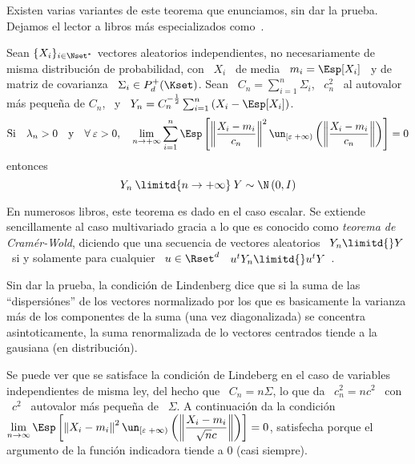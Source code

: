 Existen  varias   variantes  de  este   teorema  que  enunciamos,  sin   dar  la
prueba.  Dejamos el  lector a  libros m\'as  especializados como~\cite{AshDol99,
  Bil12, AthLah06, Lin22}.

\begin{teorema}\label{Teo:MP:LindenbergFeller}
%
  Sean  $\{  X_i \}_{i  \in  \Nset^*}$  vectores  aleatorios independientes,  no
  necesariamente de misma distribuci\'on de probabilidad, con \ $X_i$ \ de media
  \ $m_i = \Esp[X_i]$ \ y de matriz de covarianza \ $\Sigma_i \in P_d^+(\Kset)$.
  Sean \ $C_n = \sum_{i=1}^n \Sigma_i$, \ $c_n^2$ \ al autovalor m\'as peque\~na
  de $C_n$,  \ y  \ $Y_n  = C_n^{-\frac12} \sum_{i=1}^n  \left( X_i  - \Esp[X_i]
  \right)$.
  \[
  \mbox{Si} \quad \lambda_n > 0 \quad \mbox{y} \quad \forall \: \varepsilon > 0,
  \quad  \lim_{n  \to  +\infty}  \sum_{i=1}^n  \Esp\left[  \left\|  \frac{X_i  -
        m_i}{c_n} \right\|^2  \un_{\left[ \varepsilon \;  +\infty \right)}\left(
      \left\| \frac{X_i - m_i}{c_n} \right\| \right) \right] = 0
  \]
  entonces
  \[
  Y_n \: \limitd{n \to +\infty} \: Y \sim \N\left( 0 , I \right)
  \]
\end{teorema}
%
En  numerosos libros,  este teorema  es  dado en  el caso  escalar. Se  extiende
sencillamente al caso multivariado gracia a lo que es conocido como {\it teorema
  de Cram\'er-Wold},  diciendo que una  secuencia de vectores aleatorios  \ $Y_n
\limitd{}  Y$ \  si y  solamente para  cualquier \  $u \in  \Rset^d$ \  $u^t Y_n
\limitd{} u^t Y$~\cite{AshDol99, AthLah06, Bil12}.

Sin dar  la prueba,  la condici\'on  de Lindenberg dice  que si  la suma  de las
``dispersi\'ones'' de  los vectores  normalizado por los  que es  basicamente la
varianza  m\'as  de  los componentes  de  la  suma  (una vez  diagonalizada)  se
concentra asintoticamente, la suma renormalizada de lo vectores centrados tiende
a la gausiana (en distribuci\'on).

Se  puede ver  que  se  satisface la  condici\'on  de Lindeberg  en  el caso  de
variables independientes de misma ley, del hecho  que \ $C_n = n \Sigma$, lo que
da \ $c_n^2 = n c^2$ \ con  \ $c^2$ \ autovalor m\'as peque\~na de \ $\Sigma$. A
continuaci\'on da la condici\'on \ $\displaystyle \lim_{n \to \infty} \Esp\left[
  \left\| X_i - m_i \right\|^2 \un_{\left[ \varepsilon \; +\infty \right)}\left(
    \left\|  \frac{X_i  -  m_i}{\sqrt{n}  c}  \right\|  \right)  \right]  =  0$,
satisfecha  porque el  argumento de  la funci\'on  indicadora tiende  a  0 (casi
siempre).

